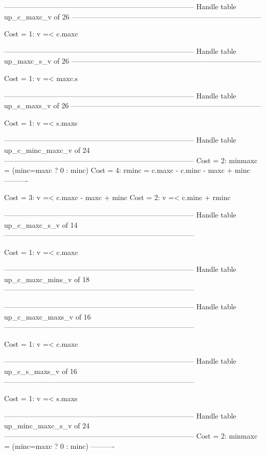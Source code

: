 --------------------------------------------------------------------------------
Handle table up_c_maxc_v of 26
--------------------------------------------------------------------------------

Cost =  1:  v =< c.maxc

--------------------------------------------------------------------------------
Handle table up_maxc_s_v of 26
--------------------------------------------------------------------------------

Cost =  1:  v =< maxc.s

--------------------------------------------------------------------------------
Handle table up_s_maxs_v of 26
--------------------------------------------------------------------------------

Cost =  1:  v =< s.maxs

--------------------------------------------------------------------------------
Handle table up_c_minc_maxc_v of 24
--------------------------------------------------------------------------------
Cost =  2:  minmaxc = (minc=maxc ? 0 : minc)
Cost =  4:  rminc   = c.maxc - c.minc - maxc + minc
----------

Cost =  3:  v =< c.maxc - maxc + minc
Cost =  2:  v =< c.minc + rminc

--------------------------------------------------------------------------------
Handle table up_c_maxc_s_v of 14
--------------------------------------------------------------------------------

Cost =  1:  v =< c.maxc

--------------------------------------------------------------------------------
Handle table up_c_maxc_mins_v of 18
--------------------------------------------------------------------------------


--------------------------------------------------------------------------------
Handle table up_c_maxc_maxs_v of 16
--------------------------------------------------------------------------------

Cost =  1:  v =< c.maxc

--------------------------------------------------------------------------------
Handle table up_c_s_maxs_v of 16
--------------------------------------------------------------------------------

Cost =  1:  v =< s.maxs

--------------------------------------------------------------------------------
Handle table up_minc_maxc_s_v of 24
--------------------------------------------------------------------------------
Cost =  2:  minmaxc = (minc=maxc ? 0 : minc)
----------

